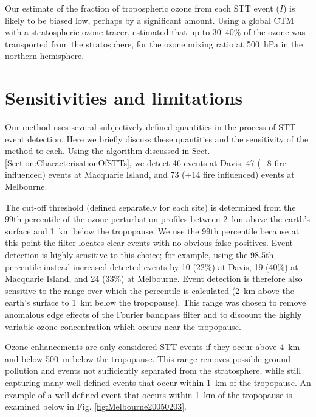 \documentclass[acp, manuscript]{copernicus} %
\begin{document}
    
    Our estimate of the fraction of tropospheric ozone from each STT event ($I$) is likely to be biased low, perhaps by a significant amount.
    Using a global CTM with a stratospheric ozone tracer, \citet{Terao2008} estimated that up to 30--40\% of the ozone was transported from the stratosphere, for the ozone mixing ratio at 500~hPa in the northern hemisphere.

\section{Sensitivities and limitations}
\label{sec:sensitivity}
  Our method uses several subjectively defined quantities in the process of STT event detection.
  Here we briefly discuss these quantities and the sensitivity of the method to each.
  Using the algorithm discussed in Sect. \ref{Section:CharacterisationOfSTTs}, we detect 46 events at Davis, 47 (+8 fire influenced) events at Macquarie Island, and 73 (+14 fire influenced) events at Melbourne.
  
  The cut-off threshold (defined separately for each site) is determined from the 99th percentile of the ozone perturbation profiles between 2~km above the earth's surface and 1~km below the tropopause.
  We use the 99th percentile because at this point the filter locates clear events with no obvious false positives.
  Event detection is highly sensitive to this choice; for example, using the 98.5th percentile instead increased detected events by 10 (22\%) at Davis, 19 (40\%) at Macquarie Island, and 24 (33\%) at Melbourne.
  Event detection is therefore also sensitive to the range over which the percentile is calculated (2~km above the earth's surface to 1~km below the tropopause).
  This range was chosen to remove anomalous edge effects of the Fourier bandpass filter and to discount the highly variable ozone concentration which occurs near the tropopause.
  
  Ozone enhancements are only considered STT events if they occur above 4~km and below 500~m below the tropopause.
  This range removes possible ground pollution and events not sufficiently separated from the stratosphere, while still capturing many well-defined events that occur within 1~km of the tropopause.
  An example of a well-defined event that occurs within 1~km of the tropopause is examined below in Fig. \ref{fig:Melbourne20050203}.
  
\end{document}
